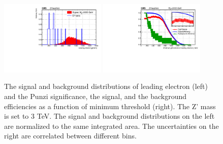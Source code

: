 \begin{figure}[htbp]
   \centering
   \includegraphics[width=0.45\textwidth]{optimization/plot_1st_pt/plot_1st_pt_input_in_Zprime_mass_3000.pdf}
   \includegraphics[width=0.45\textwidth]{optimization/plot_1st_pt/plot_1st_pt_Significance_and_efficiency_for_Zprme_M_3000.pdf}
   \caption{The signal and background distributions of leading electron \pt 
(left) and the Punzi significance, the signal, and the background efficiencies as a 
 function of minimum \pt threshold (right). The Z' mass is set to 3 TeV. The 
   signal and background distributions on the left are normalized to the same 
   integrated area. The uncertainties on the right are correlated between 
 different bins.}
   \label{fig:leadptthree}
\end{figure}


